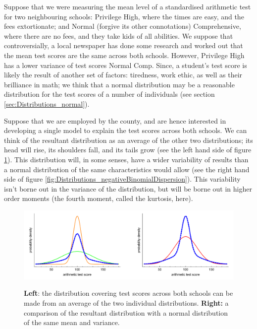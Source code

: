 \documentclass[11pt,fullpage]{book}
\begin{document}
Suppose that we were measuring the mean level of a standardised arithmetic test for two neighbouring schools: Privilege High, where the times are easy, and the fees extortionate; and Normal (forgive its other connotations) Comprehensive, where there are no fees, and they take kids of all abilities. We suppose that controversially, a local newspaper has done some research and worked out that the mean test scores are the same across both schools. However, Privilege High has a lower variance of test scores Normal Comp. Since, a student's test score is likely the result of another set of factors: tiredness, work ethic, as well as their brilliance in math; we think that a normal distribution may be a reasonable distribution for the test scores of a number of individuals (see section \ref{sec:Distributions_normal}). 

Suppose that we are employed by the county, and are hence interested in developing a single model to explain the test scores across both schools. We can think of the resultant distribution as an average of the other two distributions; its head will rise, its shoulders fall, and its tails grow (see the left hand side of figure \ref{fig:Distributions_tArithmeticDispersion}). This distribution will, in some senses, have a wider variability of results than a normal distribution of the same characteristics would allow (see the right hand side of figure \ref{fig:Distributions_negativeBinomialDispersion}). This variability isn't borne out in the variance of the distribution, but will be borne out in higher order moments (the fourth moment, called the kurtosis, here). 

\begin{figure}
\centering
\scalebox{0.5} 
{\includegraphics{Distributions_tArithmeticDispersion.pdf}}
\caption{\textbf{Left}: the distribution covering test scores across both schools can be made from an average of the two individual distributions. \textbf{Right:} a comparison of the resultant distribution with a normal distribution of the same mean and variance.}\label{fig:Distributions_tArithmeticDispersion}
\end{figure}
\end{document}
